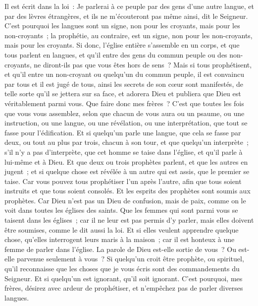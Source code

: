 \begin{multicols}{2}
Il est écrit dans la loi~: Je parlerai à ce peuple par des gens d'une autre langue, et par des lèvres étrangères, et ils ne m'écouteront pas même ainsi, dit le Seigneur.
C'est pourquoi les langues sont un signe, non pour les croyants, mais pour les non-croyants~; la prophétie, au contraire, est un signe, non pour les non-croyants, mais pour les croyants.
Si donc, l'église entière s'assemble en un corps, et que tous parlent en langues, et qu'il entre des gens du commun peuple ou des non-croyants, ne diront-ils pas que vous êtes hors de sens~?
Mais si tous prophétisent, et qu'il entre un non-croyant ou quelqu'un du commun peuple, il est convaincu par tous et il est jugé de tous,
ainsi les secrets de son cœur sont manifestés, de telle sorte qu'il se jettera sur sa face, et adorera Dieu et publiera que Dieu est véritablement parmi vous.
Que faire donc mes frères~? C'est que toutes les fois que vous vous assemblez, selon que chacun de vous aura ou un psaume, ou une instruction, ou une langue, ou une révélation, ou une interprétation, que tout se fasse pour l'édification.
Et si quelqu'un parle une langue, que cela se fasse par deux, ou tout au plus par trois, chacun à son tour, et que quelqu'un interprète~;
s'il n'y a pas d'interprète, que cet homme se taise dans l'église, et qu'il parle à lui-même et à Dieu.
Et que deux ou trois prophètes parlent, et que les autres en jugent~;
et si quelque chose est révélée à un autre qui est assis, que le premier se taise.
Car vous pouvez tous prophétiser l'un après l'autre, afin que tous soient instruits et que tous soient consolés.
Et les esprits des prophètes sont soumis aux prophètes.
Car Dieu n'est pas un Dieu de confusion, mais de paix, comme on le voit dans toutes les églises des saints.
Que les femmes qui sont parmi vous se taisent dans les églises~; car il ne leur est pas permis d'y parler, mais elles doivent être soumises, comme le dit aussi la loi.
Et si elles veulent apprendre quelque chose, qu'elles interrogent leurs maris à la maison~; car il est honteux à une femme de parler dans l'église.
 La parole de Dieu est-elle sortie de vous~? Ou est-elle parvenue seulement à vous~?
Si quelqu'un croit être prophète, ou spirituel, qu'il reconnaisse que les choses que je vous écris sont des commandements du Seigneur.
Et si quelqu'un est ignorant, qu'il soit ignorant.
C'est pourquoi, mes frères, désirez avec ardeur de prophétiser, et n'empêchez pas de parler diverses langues.

\end{multicols}
